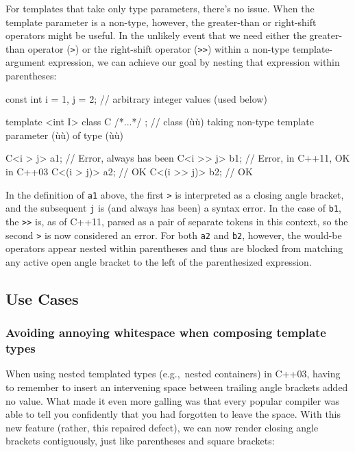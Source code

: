For templates that take only type parameters, there's no issue. When the
template parameter is a non-type, however, the greater-than or right-shift operators might be
useful. In the unlikely event that we need either the greater-than
operator (\lstinline!>!) or the right-shift operator (\lstinline!>>!) within a
non-type template-argument expression, we can achieve our goal by
nesting that expression within parentheses:

\begin{emcppslisting}
const int i = 1, j = 2;  // arbitrary integer values (used below)

template <int I> class C { /*...*/ };
    // class (ù{}ù) taking non-type template parameter (ù{}ù) of type (ù{}ù)

C<i > j>    a1;  // Error, always has been
C<i >> j>   b1;  // Error, in C++11, OK in C++03
C<(i > j)>  a2;  // OK
C<(i >> j)> b2;  // OK
\end{emcppslisting}


\noindent In the definition of \lstinline!a1! above, the first \lstinline!>! is
interpreted as a closing angle bracket, and the subsequent \lstinline!j! is
(and always has been) a syntax error. In the case of \lstinline!b1!, the
\lstinline!>>! is, as of C++11, parsed as a pair of separate tokens in this
context, so the second \lstinline!>! is now considered an error. For
both \lstinline!a2! and \lstinline!b2!, however, the would-be operators appear
nested within parentheses and thus are blocked from matching any
active open angle bracket to the left of the parenthesized expression.

\subsection[Use Cases]{Use Cases}\label{use-cases}

\subsubsection[Avoiding annoying whitespace when composing template types]{Avoiding annoying whitespace when composing template types}\label{avoiding-annoying-whitespace-when-composing-template-types}

When using nested templated types (e.g.,~nested containers) in C++03,
having to remember to insert an intervening space between trailing angle
brackets added no value. What made it even more galling was that every
popular compiler was able to tell you confidently that you had forgotten
to leave the space. With this new
feature (rather, this repaired defect), we can now render closing angle
brackets contiguously, just like parentheses and square brackets:

